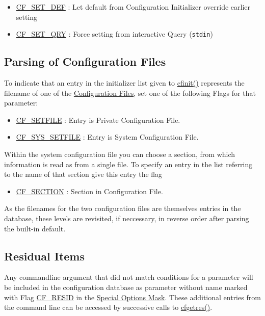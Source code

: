 \begin{itemize}
\item \hyperlink{group__special__options__mask_g17b4ef5b35afe21a4a80faa671030b65}{CF\_\-SET\_\-DEF} : Let default from Configuration Initializer override earlier setting\end{itemize}


\begin{itemize}
\item \hyperlink{group__special__options__mask_g09dcbb96c5ace43a7d5e7e4f52d387a8}{CF\_\-SET\_\-QRY} : Force setting from interactive Query ({\tt stdin})\end{itemize}
\hypertarget{config_levels_config_file_parsing}{}\subsection{Parsing of Configuration Files}\label{config_levels_config_file_parsing}
To indicate that an entry in the initializer list given to \hyperlink{group__cflib__core_ge593ff607f853bd5fc16a16bb6759314}{cfinit()} represents the filename of one of the \hyperlink{config_files}{Configuration Files}, set one of the following Flags for that parameter:

\begin{itemize}
\item \hyperlink{group__special__options__mask_gfeeb63d4d8c498bec4a237ad8b94f02f}{CF\_\-SETFILE} : Entry is Private Configuration File. \item \hyperlink{group__special__options__mask_gbb03ea68e07e388da2c1337a1582c72e}{CF\_\-SYS\_\-SETFILE} : Entry is System Configuration File. \end{itemize}


Within the system configuration file you can choose a section, from which information is read as from a single file. To specify an entry in the list referring to the name of that section give this entry the flag

\begin{itemize}
\item \hyperlink{group__special__options__mask_g603f0467f101b71f5f869381429ffef4}{CF\_\-SECTION} : Section in Configuration File. \end{itemize}


As the filenames for the two configuration files are themselves entries in the database, these levels are revisited, if neccessary, in reverse order after parsing the built-in default.\hypertarget{config_levels_residuals}{}\subsection{Residual Items}\label{config_levels_residuals}
Any commandline argument that did not match conditions for a parameter will be included in the configuration database as parameter without name marked with Flag \hyperlink{group__special__options__mask_g5415b257c706aae33d91d3947a3429c0}{CF\_\-RESID} in the \hyperlink{group__special__options__mask}{Special Options Mask}. These additional entries from the command line can be accessed by successive calls to \hyperlink{group__retrieval_g6ef6076e946383ab198ee26b9aa5603a}{cfgetres()}.

